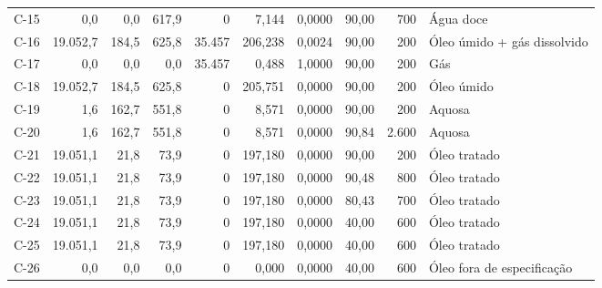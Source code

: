 \documentclass[11pt,a4paper]{article}
\numberwithin{equation}{section}
\numberwithin{table}{section}
\numberwithin{figure}{section}
\begin{document}
{\begin{longtable}{lrrrrrrrrL{2.5cm}}
C-15 & 0,0 & 0,0 & 617,9 & 0 & 7,144 & 0,0000 & 90,00 & 700 & {\scriptsize Água doce}\\
C-16 & 19.052,7 & 184,5 & 625,8 & 35.457 & 206,238 & 0,0024 & 90,00 & 200 & {\scriptsize Óleo úmido + gás dissolvido}\\
C-17 & 0,0 & 0,0 & 0,0 & 35.457 & 0,488 & 1,0000 & 90,00 & 200 & {\scriptsize Gás}\\
C-18 & 19.052,7 & 184,5 & 625,8 & 0 & 205,751 & 0,0000 & 90,00 & 200 & {\scriptsize Óleo úmido}\\
C-19 & 1,6 & 162,7 & 551,8 & 0 & 8,571 & 0,0000 & 90,00 & 200 & {\scriptsize Aquosa}\\
C-20 & 1,6 & 162,7 & 551,8 & 0 & 8,571 & 0,0000 & 90,84 & 2.600 & {\scriptsize Aquosa}\\
C-21 & 19.051,1 & 21,8 & 73,9 & 0 & 197,180 & 0,0000 & 90,00 & 200 & {\scriptsize Óleo tratado}\\
C-22 & 19.051,1 & 21,8 & 73,9 & 0 & 197,180 & 0,0000 & 90,48 & 800 & {\scriptsize Óleo tratado}\\
C-23 & 19.051,1 & 21,8 & 73,9 & 0 & 197,180 & 0,0000 & 80,43 & 700 & {\scriptsize Óleo tratado}\\
C-24 & 19.051,1 & 21,8 & 73,9 & 0 & 197,180 & 0,0000 & 40,00 & 600 & {\scriptsize Óleo tratado}\\
C-25 & 19.051,1 & 21,8 & 73,9 & 0 & 197,180 & 0,0000 & 40,00 & 600 & {\scriptsize Óleo tratado}\\
C-26 & 0,0 & 0,0 & 0,0 & 0 & 0,000 & 0,0000 & 40,00 & 600 & {\scriptsize Óleo fora de especificação}\\
\bottomrule\end{longtable}}
\end{document}
